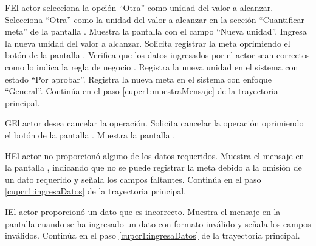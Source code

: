 \begin{UCtrayectoriaA}{F}{El actor selecciona la opción ``Otra'' como unidad del valor a alcanzar.}
	\UCpaso[\UCactor] Selecciona ``Otra'' como la unidad del valor a alcanzar en la sección ``Cuantificar meta'' de la pantalla .
	\UCpaso[\UCsist] Muestra la pantalla   con el campo ``Nueva unidad''.
	\UCpaso[\UCactor] Ingresa la nueva unidad del valor a alcanzar.
	\UCpaso[\UCactor] Solicita registrar la meta oprimiendo el botón  de la pantalla .  
	\UCpaso[\UCsist] Verifica que los datos ingresados por el actor sean correctos como lo indica la regla de negocio .   
	\UCpaso[\UCsist] Registra la nueva unidad en el sistema con estado ``Por aprobar''.
	\UCpaso[\UCsist] Registra la nueva meta en el sistema con enfoque ``General''.
	\UCpaso[] Continúa en el paso \ref{cupcr1:muestraMensaje} de la trayectoria principal.
\end{UCtrayectoriaA} 

\begin{UCtrayectoriaA}{G}{El actor desea cancelar la operación.}
	\UCpaso[\UCactor] Solicita cancelar la operación oprimiendo el botón  de la pantalla .
	\UCpaso[\UCsist] Muestra la pantalla  .
\end{UCtrayectoriaA} 

\begin{UCtrayectoriaA}{H}{El actor no proporcionó alguno de los datos requeridos.}
	\UCpaso[\UCsist] Muestra el mensaje  en la pantalla ,
	indicando que no se puede registrar la meta debido a la omisión de un dato requerido y señala los campos faltantes.
	\UCpaso[] Continúa en el paso \ref{cupcr1:ingresaDatos} de la trayectoria principal.
\end{UCtrayectoriaA}

\begin{UCtrayectoriaA}{I}{El actor proporcionó un dato que es incorrecto.}
	\UCpaso[\UCsist] Muestra el mensaje  en la pantalla 
	cuando se ha ingresado un dato con formato inválido y señala los campos inválidos.
	\UCpaso[] Continúa en el paso \ref{cupcr1:ingresaDatos} de la trayectoria principal.
\end{UCtrayectoriaA}
 
